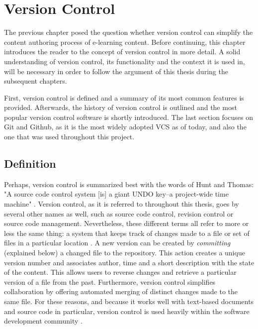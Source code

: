 \chapter{Version Control} \label{chapter:version-control}
The previous chapter posed the question whether version control can simplify the content authoring process of e-learning content. Before continuing, this chapter introduces the reader to the concept of version control in more detail. A solid understanding of version control, its functionality and the context it is used in, will be necessary in order to follow the argument of this thesis during the subsequent chapters.

First, version control is defined and a summary of its most common features is provided. Afterwards, the history of version control is outlined and the most popular version control software is shortly introduced. The last section focuses on Git and Github, as it is the most widely adopted VCS as of today, and also the one that was used throughout this project.

\section{Definition}
Perhaps, version control is summarized best with the words of Hunt and Thomas: "A source code control system [is] a giant UNDO key–a project-wide time machine" \cite{hunt_pragmatic_1999}. Version control, as it is referred to throughout this thesis, goes by several other names as well, such as source code control, revision control or source code management. Nevertheless, these different terms all refer to more or less the same thing: a system that keeps track of changes made to a file or set of files in a particular location \cite{ruparelia_history_2010}. A new version can be created by \textit{committing} (explained below) a changed file to the repository. This action creates a unique version number and associates author, time and a short description with the state of the content. This allows users to reverse changes and retrieve a particular version of a file from the past. Furthermore, version control simplifies collaboration by offering automated merging of distinct changes made to the same file. For these reasons, and because it works well with text-based documents and source code in particular, version control is used heavily within the software development community \cite{_stack_2015}.

